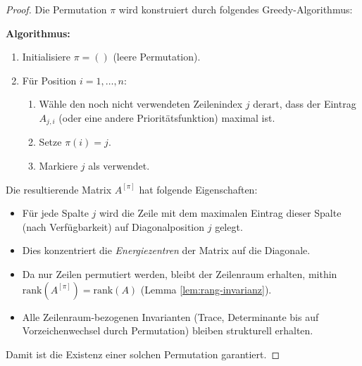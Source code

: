 \documentclass[a4paper,12pt]{article}
\theoremstyle{definition}
\begin{document}
\begin{proof}
	Die Permutation $\pi$ wird konstruiert durch folgendes Greedy-Algorithmus:
	
	\textbf{Algorithmus:}
	\begin{enumerate}
		\item Initialisiere $\pi = ()$ (leere Permutation).
		\item Für Position $i = 1, \ldots, n$:
		\begin{enumerate}
			\item Wähle den noch nicht verwendeten Zeilenindex $j$ derart, dass der Eintrag $A_{j,i}$ (oder eine andere Prioritätsfunktion) maximal ist.
			\item Setze $\pi(i) = j$.
			\item Markiere $j$ als verwendet.
		\end{enumerate}
	\end{enumerate}
	
	Die resultierende Matrix $A^{[\pi]}$ hat folgende Eigenschaften:
	\begin{itemize}
		\item Für jede Spalte $j$ wird die Zeile mit dem maximalen Eintrag dieser Spalte (nach Verfügbarkeit) auf Diagonalposition $j$ gelegt.
		\item Dies konzentriert die \emph{Energiezentren} der Matrix auf die Diagonale.
		\item Da nur Zeilen permutiert werden, bleibt der Zeilenraum erhalten, mithin $\text{rank}(A^{[\pi]}) = \text{rank}(A)$ (Lemma \ref{lem:rang-invarianz}).
		\item Alle Zeilenraum-bezogenen Invarianten (Trace, Determinante bis auf Vorzeichenwechsel durch Permutation) bleiben strukturell erhalten.
	\end{itemize}
	
	Damit ist die Existenz einer solchen Permutation garantiert.
\end{proof}
\end{document}
